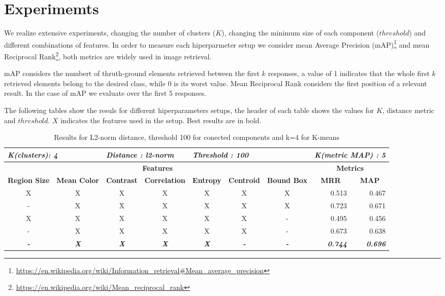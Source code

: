 \section{Experimemts}
\label{sec:experiments}

We realize extensive experiments, changing the number of clusters ($K$), changing the minimum size of each component ($threshold$) and different combinations of features. In order to measure each hiperparmeter setup we consider mean Average Precision (mAP)\footnote{\url{https://en.wikipedia.org/wiki/Information_retrieval\#Mean_average_precision}} and mean Reciprocal Rank\footnote{\url{https://en.wikipedia.org/wiki/Mean_reciprocal_rank}}, both metrics are widely used in image retrieval. 

mAP considers the numbert of thruth-ground elements retrieved between the first $k$ responses, a value of 1 indicates that the whole first $k$ retrieved elements belong to the desired class, while 0 is its worst value. Mean Reciprocal Rank considers the first position of a relevant result. In the case of mAP we evaluate over the first 5 responses.

The following tables show the resuls for different hiperparameters setups, the header of each table shows the values for $K$, distance metric and $threshold$. $X$ indicates the features used in the setup. Best results are in bold.

\begin{table}[H]
\centering

\begin{tabular}{|c|c|c|c|c|c|c|r|r|}
\hline
\multicolumn{2}{|l|}{\textit{\textbf{K(clusters): 4}}} & \multicolumn{2}{l|}{\textit{\textbf{Distance : l2-norm}}} & \multicolumn{3}{l|}{\textit{\textbf{Threshold : 100}}} & \multicolumn{2}{l|}{\textit{\textbf{K(metric MAP) :  5}}} \\ \hline
\multicolumn{7}{|c|}{\textbf{Features}} & \multicolumn{2}{c|}{\textbf{Metrics}} \\ \hline
\textbf{Region Size} & \textbf{Mean Color} & \textbf{Contrast} & \textbf{Correlation} & \textbf{Entropy} & \textbf{Centroid} & \textbf{Bound Box} & \multicolumn{1}{c|}{\textbf{MRR}} & \multicolumn{1}{c|}{\textbf{MAP}} \\ \hline
X & X & X & X & X & X & X & 0.513 & 0.467 \\ \hline
- & X & X & X & X & X & X & 0.723 & 0.671 \\ \hline
X & X & X & X & X & X & - & 0.495 & 0.456 \\ \hline
- & X & X & X & X & X & - & 0.673 & 0.638 \\ \hline
\textit{\textbf{-}} & \textit{\textbf{X}} & \textit{\textbf{X}} & \textit{\textbf{X}} & \textit{\textbf{X}} & \textit{\textbf{-}} & \textit{\textbf{-}} & \textit{\textbf{0.744}} & \textit{\textbf{0.696}} \\ \hline
\end{tabular}


\caption{Results for L2-norm distance, threshold 100 for conected components and k=4 for K-means}
\label{table:results01}
\end{table}


